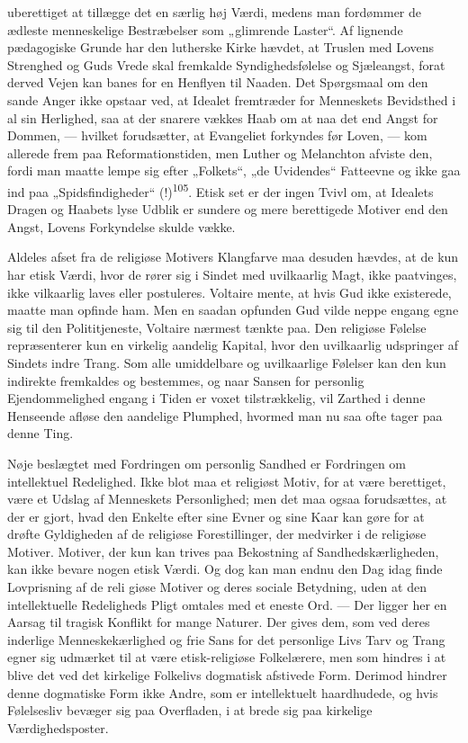 \documentclass[12pt,a4paper,openany]{book}
\newcommand{\opage}[1]{\marginnote{\footnotesize\textit{[#1]}}}
\begin{document}
uberettiget at tillægge det en særlig høj Værdi, medens man fordømmer de
ædleste menneskelige Bestræbelser som „glimrende Laster“. Af lignende
pædagogiske Grunde har den lutherske Kirke hævdet, at Truslen med Lovens
Strenghed og Guds Vrede skal fremkalde Syndighedsfølelse og Sjæleangst,
forat derved Vejen kan banes for en Henflyen til Naaden. Det Spørgsmaal
om den sande Anger ikke opstaar ved, at Idealet fremtræder for
Menneskets Bevidsthed i al sin Herlighed, saa at der snarere vækkes Haab
om at naa det end Angst for Dommen, --- hvilket forudsætter, at
Evangeliet forkyndes før Loven, --- kom allerede frem paa
Reformationstiden, men Luther og Melanchton afviste den, fordi man
maatte lempe sig efter „Folkets“, „de Uvidendes“ Fatteevne og ikke gaa
ind paa „Spidsfindigheder“ (!)\textsuperscript{105}. Etisk set er der
ingen Tvivl om, at Idealets Dragen og Haabets lyse Udblik er sundere og
mere berettigede Motiver end den Angst, Lovens Forkyndelse skulde vække.

Aldeles afset fra de religiøse Motivers Klangfarve maa desuden hævdes,
at de kun har etisk Værdi, hvor de rører sig i Sindet med uvilkaarlig
Magt, ikke paatvinges, ikke vilkaarlig laves eller postuleres. Voltaire
mente, at hvis Gud ikke existerede, maatte man opfinde ham. Men en
saadan opfunden Gud vilde neppe engang egne sig til den Polititjeneste,
Voltaire nærmest tænkte paa. Den religiøse Følelse repræsenterer kun en
virkelig aandelig Kapital, hvor den uvilkaarlig udspringer af Sindets
indre Trang. Som alle umiddelbare og uvilkaarlige Følelser kan den kun
indirekte fremkaldes og bestemmes, og naar Sansen for personlig
Ejendommelighed engang i Tiden er voxet tilstrækkelig, vil Zarthed i
denne Henseende afløse den aandelige Plumphed, hvormed man nu saa ofte
tager paa denne Ting.

Nøje beslægtet med Fordringen om personlig Sandhed er Fordringen om
intellektuel Redelighed. Ikke blot maa et religiøst Motiv, for at være
berettiget, være et Udslag af Menneskets Personlighed; men det maa ogsaa
forudsættes, at der er gjort, hvad den Enkelte efter sine Evner og sine
Kaar kan gøre for at drøfte Gyldigheden af de religiøse Forestillinger,
der medvirker i de religiøse Motiver. Motiver, der kun kan trives paa
Bekostning af Sandhedskærligheden, kan ikke bevare nogen etisk Værdi. Og
dog kan man endnu den Dag idag finde Lovprisning af de reli%
\opage{221}giøse Motiver og deres sociale Betydning, uden at den
intellektuelle Redeligheds Pligt omtales med et eneste Ord. --- Der
ligger her en Aarsag til tragisk Konflikt for mange Naturer. Der gives
dem, som ved deres inderlige Menneskekærlighed og frie Sans for det
personlige Livs Tarv og Trang egner sig udmærket til at være
etisk-religiøse Folkelærere, men som hindres i at blive det ved det
kirkelige Folkelivs dogmatisk afstivede Form. Derimod hindrer denne
dogmatiske Form ikke Andre, som er intellektuelt haardhudede, og hvis
Følelsesliv bevæger sig paa Overfladen, i at brede sig paa kirkelige
Værdighedsposter.
\end{document}
